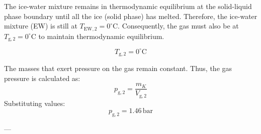 The ice-water mixture remains in thermodynamic equilibrium at the solid-liquid phase boundary until all the ice (solid phase) has melted. Therefore, the ice-water mixture (EW) is still at \( T_{\text{EW},2} = 0^\circ\text{C} \). Consequently, the gas must also be at \( T_{\text{g},2} = 0^\circ\text{C} \) to maintain thermodynamic equilibrium.  

\[
T_{\text{g},2} = 0^\circ\text{C}
\]

The masses that exert pressure on the gas remain constant. Thus, the gas pressure is calculated as:  
\[
p_{\text{g},2} = \frac{m_K}{V_{\text{g},2}}
\]
Substituting values:  
\[
p_{\text{g},2} = 1.46 \, \text{bar}
\]

---